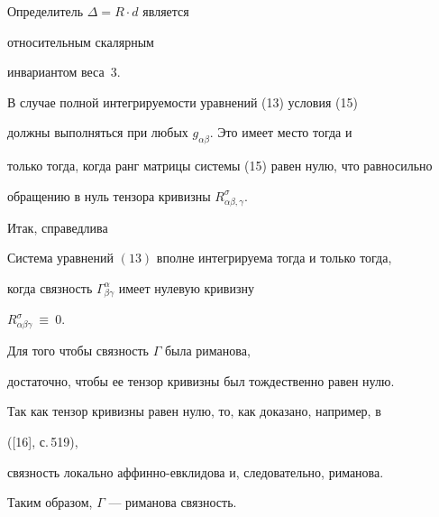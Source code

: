 \begin{cornonum}


Определитель $\Delta=R\cdot d$ является


относительным скалярным


инвариантом веса~3.


\end{cornonum}





В случае полной интегрируемости уравнений (13) условия (15)


должны выполняться при любых $g_{\alpha \beta}$. Это имеет место тогда и


только тогда, когда ранг матрицы системы (15) равен нулю, что равносильно


обращению в нуль тензора кривизны $R^{\sigma}_{\alpha \beta, \gamma}$.





Итак, справедлива





\begin{thm}


Система уравнений $(13)$ вполне интегрируема тогда и только тогда,


когда связность $\Gamma^{\alpha}_{\beta \gamma} $ имеет нулевую кривизну


$R^{\sigma}_{\alpha \beta \gamma}~\equiv~0$.


\end{thm}





\begin{cornonum}


Для того чтобы связность $\Gamma $ была риманова,


достаточно, чтобы ее тензор кривизны был тождественно равен нулю.


\end{cornonum}





Так как тензор кривизны равен нулю, то, как доказано, например, в


([16], с.\,519),


связность локально аффинно-евклидова и, следовательно, риманова.


Таким образом, $\Gamma $ --- риманова связность.






